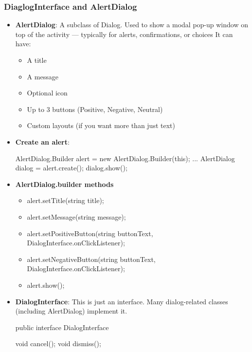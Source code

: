 \documentclass{report}
\begin{document}
    \subsubsection{DiaglogInterface and AlertDialog}
    \begin{itemize}
        \item \textbf{AlertDialog}: A subclass of Dialog. Used to show a modal pop-up window on top of the activity — typically for alerts, confirmations, or choices
            It can have:
            \begin{itemize}
                \item A title
                \item A message
                \item Optional icon
                \item Up to 3 buttons (Positive, Negative, Neutral)
                \item Custom layouts (if you want more than just text)
            \end{itemize}
        \item \textbf{Create an alert}:
            \bigbreak \noindent 
            \begin{javacode}
            AlertDialog.Builder alert = new AlertDialog.Builder(this);
            ...
            AlertDialog dialog = alert.create();
            dialog.show();
            \end{javacode}
        \item \textbf{AlertDialog.builder methods}
            \begin{itemize}
                \item alert.setTitle(string title);
                \item alert.setMessage(string message);
                \item alert.setPositiveButton(string buttonText, DialogInterface.onClickListener);
                \item alert.setNegativeButton(string buttonText, DialogInterface.onClickListener);
                \item alert.show();
            \end{itemize}
        \item \textbf{DialogInterface}: This is just an interface. Many dialog-related classes (including AlertDialog) implement it.
            \bigbreak \noindent 
            \begin{javacode}
                public interface DialogInterface {
                    void cancel();
                    void dismiss();

}
\end{javacode}
\end{itemize}
\end{document}
